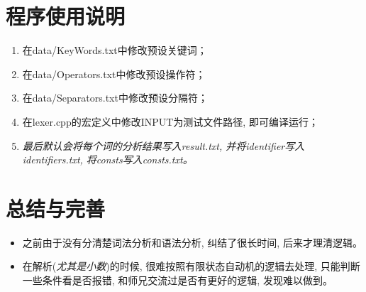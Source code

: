 \documentclass{zpt}
\begin{document}
    \section{程序使用说明}
    \begin{enumerate}
        \item 在data/KeyWords.txt中修改预设关键词；
        \item 在data/Operators.txt中修改预设操作符；
        \item 在data/Separators.txt中修改预设分隔符；
        \item 在lexer.cpp的宏定义中修改INPUT为测试文件路径, 即可编译运行；
        \item \emph{最后默认会将每个词的分析结果写入result.txt, 并将identifier写入identifiers.txt, 将consts写入consts.txt。}
    \end{enumerate}
    \section{总结与完善}
    \begin{itemize}
    \item 之前由于没有分清楚词法分析和语法分析, 纠结了很长时间, 后来才理清逻辑。
    \item 在解析(\emph{尤其是小数})的时候, 很难按照有限状态自动机的逻辑去处理, 只能判断一些条件看是否报错, 和师兄交流过是否有更好的逻辑, 发现难以做到。
    \end{itemize}
\end{document}
